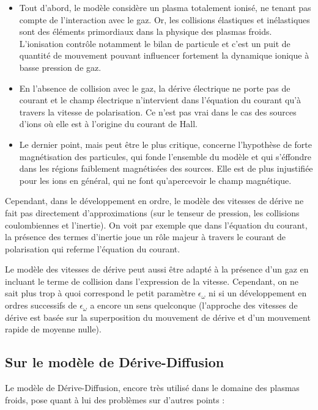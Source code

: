 \begin{refsection}
\begin{itemize}
  \item Tout d'abord, le modèle considère un plasma totalement ionisé, ne tenant
  pas compte de l'interaction avec le gaz. Or, les collisions élastiques et
  inélastiques sont des éléments primordiaux dans la physique des plasmas froids. L'ionisation contrôle
  notamment le bilan de particule et c'est un puit de quantité de mouvement
  pouvant influencer fortement la dynamique ionique à basse pression de gaz.
  \item En l'absence de collision avec le gaz, la dérive électrique ne porte pas
  de courant et le champ électrique n'intervient dans l'équation du courant qu'à
  travers la vitesse de polarisation. Ce n'est pas vrai dans le cas des sources
  d'ions où elle est à l'origine du courant de Hall.
  \item Le dernier point, mais peut être le plus critique, concerne l'hypothèse
  de forte magnétisation des particules, qui fonde l'ensemble du modèle et qui
  s'éffondre dans les régions faiblement magnétisées des sources. Elle est de
  plus injustifiée pour les ions en général, qui ne font qu'apercevoir le champ
  magnétique.
\end{itemize}

Cependant, dans le développement en ordre, le modèle des vitesses de
dérive ne fait pas directement d'approximations (sur le tenseur de pression, les
collisions coulombiennes et l'inertie). On voit par exemple que dans l'équation
du courant, la présence des termes d'inertie joue un rôle majeur à travers le
courant de polarisation qui referme l'équation du courant.

Le modèle des vitesses de dérive peut aussi être adapté à la présence d'un gaz
en incluant le terme de collision dans l'expression de la vitesse. Cependant, 
on ne sait plus trop à quoi correspond le petit paramètre $\epsilon_\omega$ ni
si un développement en ordres successifs de $\epsilon_\omega$ a encore 
un sens quelconque (l'approche des vitesses de dérive est basée sur la
superposition du mouvement de dérive et d'un mouvement rapide de moyenne nulle).

\subsection{Sur le modèle de Dérive-Diffusion}

Le modèle de Dérive-Diffusion, encore très utilisé dans le domaine des plasmas
froids, pose quant à lui des problèmes sur d'autres points :


\end{refsection}
